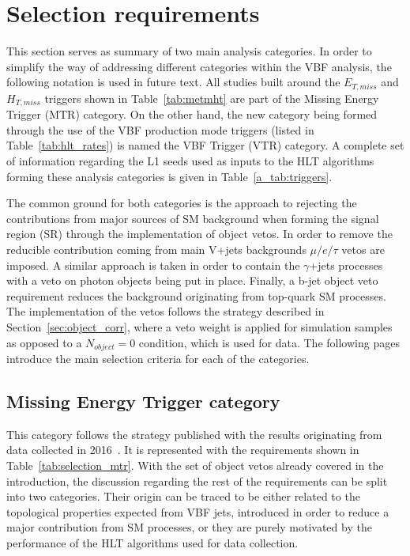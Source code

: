 \section{Selection requirements}
\hspace{10pt} This section serves as summary of two main analysis categories. In order to simplify the way of addressing different categories within the VBF analysis, the following notation is used in future text. All studies built around the $E_{T,miss}$ and $H_{T,miss}$ triggers shown in Table~\ref{tab:metmht} are part of the Missing Energy Trigger (MTR) category. On the other hand, the new category being formed through the use of the VBF production mode triggers (listed in Table~\ref{tab:hlt_rates}) is named the VBF Trigger (VTR) category. A complete set of information regarding the L1 seeds used as inputs to the HLT algorithms forming these analysis categories is given in Table~\ref{a_tab:triggers}.

\hspace{10pt} The common ground for both categories is the approach to rejecting the contributions from major sources of SM background when forming the signal region (SR) through the implementation of object vetos. In order to remove the reducible contribution coming from main V+jets backgrounds $\mu/e/\tau$ vetos are imposed. A similar approach is taken in order to contain the $\gamma$+jets processes with a veto on photon objects being put in place. Finally, a b-jet object veto requirement reduces the background originating from top-quark SM processes. The implementation of the vetos follows the strategy described in Section~\ref{sec:object_corr}, where a veto weight is applied for simulation samples as opposed to a $N_{object}=0$ condition, which is used for data. The following pages introduce the main selection criteria for each of the categories.
\subsection{Missing Energy Trigger category}
\label{subsec:vbfselection}

\hspace{10pt} This category follows the strategy published with the results originating from data collected in 2016~\cite{paper:HIG_17_023}. It is represented with the requirements shown in Table~\ref{tab:selection_mtr}. With the set of object vetos already covered in the introduction, the discussion regarding the rest of the requirements can be split into two categories. Their origin can be traced to be either related to the topological properties expected from VBF jets, introduced in order to reduce a major contribution from SM processes, or they are purely motivated by the performance of the HLT algorithms used for data collection.

